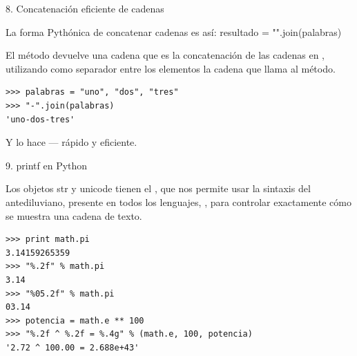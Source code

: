 \documentclass[14pt]{beamer}
\begin{document}
\begin{frame}[fragile]{8. Concatenación eficiente de cadenas}
  \begin{alertblock}
    {\centering \small
      La forma Pythónica de concatenar cadenas es así:}
    \centering \Large resultado = "".join(palabras)
  \end{alertblock}

  \small
  \begin{center}
    El método  devuelve una cadena que
    es la concatenación de las cadenas en ,
    utilizando como separador entre los elementos la cadena que llama
    al método.
  \end{center}

  \begin{exampleblock}{}
    \begin{lstlisting}
>>> palabras = "uno", "dos", "tres"
>>> "-".join(palabras)
'uno-dos-tres'
    \end{lstlisting}
  \end{exampleblock}

  \small
  \begin{center}
    Y lo hace  --- rápido y eficiente.
  \end{center}
\end{frame}

\begin{frame}[fragile]{9. printf en Python}
  \small
  \begin{block}{}
    \centering
    Los objetos str y unicode tienen el , que
    nos permite usar la sintaxis del antediluviano, presente en todos
    los lenguajes, , para controlar exactamente
    cómo se muestra una cadena de texto.
  \end{block}

  \footnotesize
  \begin{exampleblock}{}
    \begin{lstlisting}
>>> print math.pi
3.14159265359
>>> "%.2f" % math.pi
3.14
>>> "%05.2f" % math.pi
03.14
>>> potencia = math.e ** 100
>>> "%.2f ^ %.2f = %.4g" % (math.e, 100, potencia)
'2.72 ^ 100.00 = 2.688e+43'
    \end{lstlisting}
  \end{exampleblock}
\end{frame}
\end{document}
